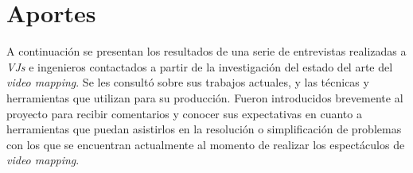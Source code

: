 ﻿\chapter{Aportes}
A continuación se presentan los resultados de una serie de entrevistas realizadas a \emph{VJs} e ingenieros contactados a partir de la investigación del estado del arte del \emph{video mapping}. Se les consultó sobre sus trabajos actuales, y las técnicas y herramientas que utilizan para su producción.
Fueron introducidos brevemente al proyecto para recibir comentarios y conocer sus expectativas en cuanto a herramientas que puedan asistirlos en la resolución o simplificación de problemas con los que se encuentran actualmente al momento de realizar los espectáculos de \emph{video mapping}.

